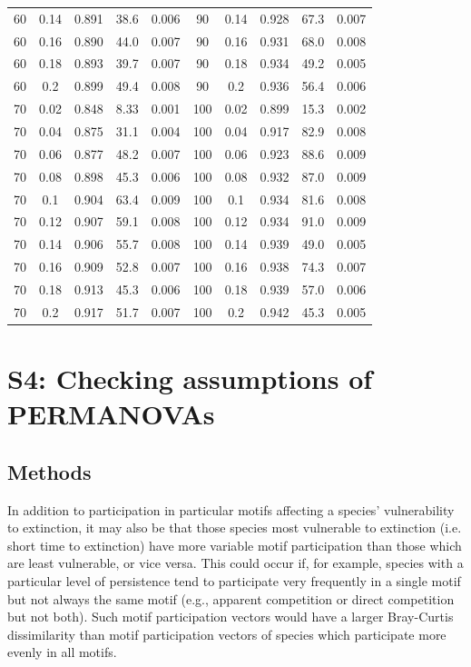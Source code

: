 \documentclass[12pt]{article}
\begin{document}
\begin{spacing}{2.0}
\begin{table}[h!]
\begin{tabular}{c c | c | c c ||c c | c | c c |}
                60&0.14&0.891&38.6&0.006	&	90&0.14&0.928&67.3&0.007\\
                60&0.16&0.890&44.0&0.007	&	90&0.16&0.931&68.0&0.008\\
                60&0.18&0.893&39.7&0.007	&	90&0.18&0.934&49.2&0.005\\
                60&0.2&0.899&49.4&0.008	&	90&0.2&0.936&56.4&0.006\\
                70&0.02&0.848&8.33&0.001	&	100&0.02&0.899&15.3&0.002\\
                70&0.04&0.875&31.1&0.004	&	100&0.04&0.917&82.9&0.008\\
                70&0.06&0.877&48.2&0.007	&	100&0.06&0.923&88.6&0.009\\
                70&0.08&0.898&45.3&0.006	&	100&0.08&0.932&87.0&0.009\\
                70&0.1&0.904&63.4&0.009	&	100&0.1&0.934&81.6&0.008\\
                70&0.12&0.907&59.1&0.008	&	100&0.12&0.934&91.0&0.009\\
                70&0.14&0.906&55.7&0.008	&	100&0.14&0.939&49.0&0.005\\
                70&0.16&0.909&52.8&0.007	&	100&0.16&0.938&74.3&0.007\\
                70&0.18&0.913&45.3&0.006	&	100&0.18&0.939&57.0&0.006\\
                70&0.2&0.917&51.7&0.007	&	100&0.2&0.942&45.3&0.005\\
				\hline
			\end{tabular}
			\end{table}

\clearpage


\section*{S4: Checking assumptions of PERMANOVAs}

	\subsection*{Methods}

        
        In addition to participation in particular motifs affecting a species' vulnerability to extinction, it may also be that those species most vulnerable to extinction (i.e. short time to extinction) have more variable motif participation than those which are least vulnerable, or vice versa. 
        This could occur if, for example, species with a particular level of persistence tend to participate very frequently in a single motif but not always the same motif (e.g., apparent competition or direct competition but not both). 
        Such motif participation vectors would have a larger Bray-Curtis dissimilarity than motif participation vectors of species which participate more evenly in all motifs.



\end{spacing}
\end{document}
